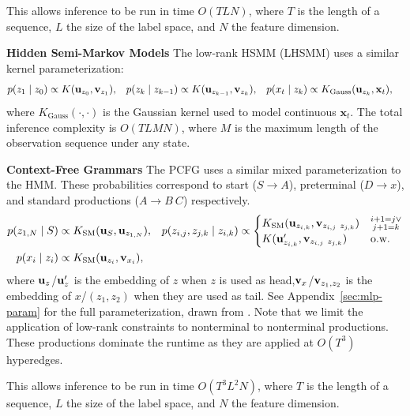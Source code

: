 \documentclass{article}
\begin{document}
This allows inference to be run in time $O(TLN)$, where $T$ is the length of a sequence, $L$ the size of the label space, and $N$ the feature dimension.

\textbf{Hidden Semi-Markov Models}
The low-rank HSMM (LHSMM) uses a similar kernel parameterization:
\begin{equation}
\label{eqn:hsmm}
\begin{aligned}
p(z_1 \mid z_0) &\propto K(\mathbf{u}_{z_0}, \mathbf{v}_{z_1}),&
p(z_k \mid z_{k-1}) &\propto K(\mathbf{u}_{z_{k-1}}, \mathbf{v}_{z_k}),&
p(x_t \mid z_k) &\propto K_{\text{Gauss}}(\mathbf{u}_{z_k}, \mathbf{x}_t),
\end{aligned}
\end{equation}
where $K_{\text{Gauss}}(\cdot, \cdot)$ is the Gaussian kernel used to model continuous $\mathbf{x}_t$. The total inference complexity is $O(TLMN )$, where $M$ is the maximum length of the observation sequence under any state.

\textbf{Context-Free Grammars}
The PCFG uses a similar mixed parameterization to the HMM.
These probabilities correspond to start ($S\to A$), preterminal ($D\to x$),
and standard productions ($A\to B\ C$) respectively.
\begin{equation}
\label{eqn:pcfg}
\begin{aligned}
p(z_{1,N} \mid S ) &\propto K_{\mathrm{SM}}(\mathbf{u}_{S}, \mathbf{u}_{z_{1,N}}),&
p( z_{i,j}, z_{j,k} \mid z_{i,k}) &\propto \begin{cases}
  K_{\mathrm{SM}}(\mathbf{u}_{z_{i,k}}, \mathbf{v}_{z_{i,j}\ z_{j,k}}) & \substack{i+1 = j \lor \\j+1=k} \\ 
 K(\mathbf{u}_{z_{i,k}}', \mathbf{v}_{z_{i,j}\ z_{j,k}}) &\text{o.w.} \\
\end{cases}\\
 p(x_i \mid z_i) &\propto K_{\mathrm{SM}}(\mathbf{u}_{z_i}, \mathbf{v}_{x_i}),\\
\end{aligned}
\end{equation}
where $\mathbf{u}_{z}$/$\mathbf{u}_z'$ is the embedding of $z$ when $z$ is used as head,$\mathbf{v}_{x}$/$\mathbf{v}_{z_1, z_2}$ is the embedding of $x$/$(z_1, z_2)$ when they are used as tail. See Appendix~\ref{sec:mlp-param} for the full
parameterization, drawn from \citet{kim2019cpcfg}. Note that we limit
the application of low-rank constraints to nonterminal to nonterminal
productions. These productions dominate the runtime as they
are applied at $O(T^3)$ hyperedges.

This allows inference to be run in time $O(T^3L^2N)$, where $T$ is the length of a sequence, $L$ the size of the label space, and $N$ the feature dimension.
\end{document}
